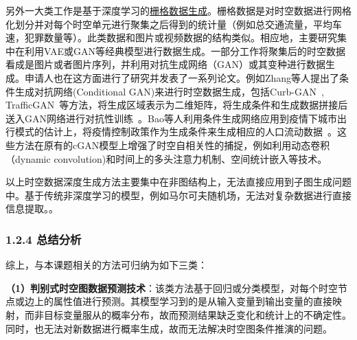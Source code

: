 另外一大类工作是基于深度学习的\underline{栅格数据生成}。栅格数据是对时空数据进行网格化划分并对每个时空单元进行聚集之后得到的统计量（例如总交通流量，平均车速，犯罪数量等）。此类数据和图片或视频数据的结构类似。相应地，主要研究集中在利用VAE或GAN等经典模型进行数据生成。一部分工作将聚集后的时空数据看成是图片或者图片序列，并利用对抗生成网络（GAN）或其变种进行数据生成。申请人也在这方面进行了研究并发表了一系列论文。例如Zhang等人提出了条件生成对抗网络(Conditional GAN)来进行时空数据生成，包括Curb-GAN~\cite{zhang2020curb}, TrafficGAN~\cite{zhang2019trafficgan}等方法，将生成区域表示为二维矩阵，将生成条件和生成数据拼接后送入GAN网络进行对抗性训练~\cite{zhang2021c,zhang2022mest,zhang2022strans}。Bao等人利用条件生成网络应用到疫情下城市出行模式的估计上，将疫情控制政策作为生成条件来生成相应的人口流动数据~\cite{bao2022covid,bao2020covid}。这些方法在原有的cGAN模型上增强了时空自相关性的捕捉，例如利用动态卷积（dynamic convolution)和时间上的多头注意力机制、空间统计嵌入等技术。


以上时空数据深度生成方法主要集中在非图结构上，无法直接应用到子图生成问题中。基于传统非深度学习的模型，例如马尔可夫随机场，无法对复杂数据进行直接信息提取。。


\subsubsection{1.2.4 总结分析}
综上，与本课题相关的方法可归纳为如下三类：

\textbf{（1）判别式时空图数据预测技术}：该类方法基于回归或分类模型，对每个时空节点或边上的属性值进行预测。其模型学习到的是从输入变量到输出变量的直接映射，而非目标变量服从的概率分布，故而预测结果缺乏变化和统计上的不确定性。同时，也无法对新数据进行概率生成，故而无法解决时空图条件推演的问题。

